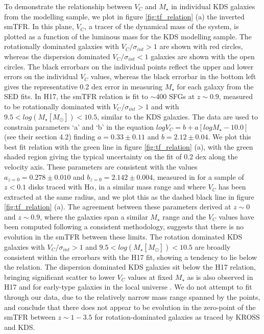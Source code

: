 \documentclass[fleqn,usenatbib]{mn2e}
\begin{document}
To demonstrate the relationship between $V_{C}$ and $M_{\star}$ in individual KDS galaxies from the modelling sample, we plot in figure \ref{fig:tf_relation} (a) the inverted smTFR.
In this plane, $V_{C}$, a tracer of the dynamical mass of the system, is plotted as a function of the luminous mass for the KDS modelling sample.
The rotationally dominated galaxies with $V_{C}/\sigma_{int} > 1$ are shown with red circles, whereas the dispersion dominated $V_{C}/\sigma_{int} < 1$  galaxies are shown with the open circles.
The black errorbars on the individual points reflect the upper and lower errors on the individual $V_{C}$ values, whereas the black errorbar in the bottom left gives the representative 0.2 dex error in measuring $M_{\star}$ for each galaxy from the SED fits.
In H17, the smTFR relation is fit to $\sim400$ SFGs at $z\sim0.9$, measured to be rotationally dominated with $V_{C}/\sigma_{int} > 1$ and with $9.5 < log(M_{\star}[M_{\odot}]) < 10.5$, similar to the KDS galaxies.
The data are used to constrain parameters `a' and `b' in the equation $logV_{C}=b+a[logM_{\star} - 10.0]$ (see their section 4.2) finding $a = 0.33 \pm 0.11$ and $b = 2.12 \pm 0.04$.
We plot this best fit relation with the green line in figure \ref{fig:tf_relation} (a), with the green shaded region giving the typical uncertainty on the fit of 0.2 dex along the velocity axis.
These parameters are consistent with the values $a_{z=0} = 0.278 \pm 0.010$ and $b_{z=0} = 2.142 \pm 0.004$, measured in \cite{Reyes2011} for a sample of $z<0.1$ disks traced with H$\alpha$, in a similar mass range and where $V_{C}$ has been extracted at the same radius, and we plot this as the dashed black line in figure \ref{fig:tf_relation} (a).
The agreement between these parameters derived at $z\sim0$ and $z\sim0.9$, where the galaxies span a similar $M_{\star}$ range and the $V_{C}$ values have been computed following a consistent methodology, suggests that there is no evolution in the smTFR between these limits.
The rotation dominated KDS galaxies with $V_{C}/\sigma_{int} > 1$ and $9.5 < log(M_{\star}[M_{\odot}]) < 10.5$ are broadly consistent within the errorbars with the H17 fit, showing a tendency to lie below the relation.
The dispersion dominated KDS galaxies sit below the H17 relation, bringing significant scatter to lower $V_{C}$ values at fixed $M_{\star}$ as is also observed in H17 and for early-type galaxies in the local universe \citep[e.g.][]{Romanowsky2012}.  
We do not attempt to fit through our data, due to the relatively narrow mass range spanned by the points, and conclude that there does not appear to be evolution in the zero-point of the smTFR between $z\sim1-3.5$ for rotation-dominated galaxies as traced by KROSS and KDS.
\end{document}
